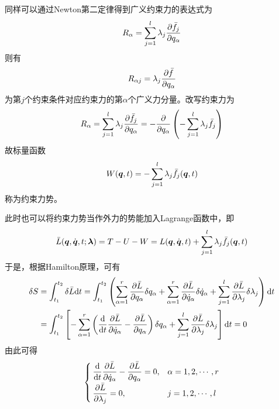 同样可以通过Newton第二定律得到广义约束力的表达式为
\begin{equation*}
	R_\alpha = \sum_{j=1}^l \lambda_j \frac{\partial \bar{f}_j}{\partial q_\alpha}
\end{equation*}
则有
\begin{equation}
	R_{\alpha j} = \lambda_j \frac{\partial \bar{f}}{\partial q_\alpha}
\end{equation}
为第$j$个约束条件对应约束力的第$\alpha$个广义力分量。改写约束力为
\begin{equation*}
	R_\alpha = \sum_{j=1}^l \lambda_j \frac{\partial \bar{f}_j}{\partial q_\alpha} = -\frac{\partial}{\partial q_\alpha} \left(-\sum_{j=1}^l \lambda_j \bar{f}_j\right)
\end{equation*}
故标量函数
\begin{equation}
	W(\boldsymbol{q},t) = -\sum_{j=1}^l \lambda_j \bar{f}_j(\boldsymbol{q},t)
\end{equation}
称为{\heiti 约束力势}。

此时也可以将约束力势当作外力的势能加入Lagrange函数中，即
\begin{equation*}
	\bar{L}(\boldsymbol{q},\dot{\boldsymbol{q}},t;\boldsymbol{\lambda}) = T-U-W = L(\boldsymbol{q},\dot{\boldsymbol{q}},t) + \sum_{j=1}^l \lambda_j \bar{f}_j (\boldsymbol{q},t)
\end{equation*}
于是，根据Hamilton原理，可有
\begin{align*}
	\delta S & = \int_{t_1}^{t_2} \delta \bar{L} \mathrm{d} t = \int_{t_1}^{t_2} \left(\sum_{\alpha=1}^r \frac{\partial \bar{L}}{\partial q_\alpha} \delta q_\alpha + \sum_{\alpha=1}^r \frac{\partial \bar{L}}{\partial \dot{q}_\alpha} \delta \dot{q}_\alpha + \sum_{j=1}^l \frac{\partial \bar{L}}{\partial \lambda_j} \delta \lambda_j \right) \mathrm{d} t \\
	& = \int_{t_1}^{t_2} \left[-\sum_{\alpha=1}^r \left(\frac{\mathrm{d}}{\mathrm{d} t} \frac{\partial \bar{L}}{\partial \dot{q}_\alpha} - \frac{\partial \bar{L}}{\partial q_\alpha}\right)\delta q_\alpha + \sum_{j=1}^l \frac{\partial \bar{L}}{\partial \lambda_j} \delta \lambda_j \right] \mathrm{d} t = 0
\end{align*}
由此可得
\begin{equation}
	\begin{cases}
		\displaystyle \frac{\mathrm{d}}{\mathrm{d} t} \frac{\partial \bar{L}}{\partial \dot{q}_\alpha} - \frac{\partial \bar{L}}{\partial q_\alpha} = 0, & \alpha =1,2,\cdots,r \\[1.5ex]
		\displaystyle \frac{\partial \bar{L}}{\partial \lambda_j} = 0,& j = 1,2,\cdots,l
	\end{cases}
\end{equation}

